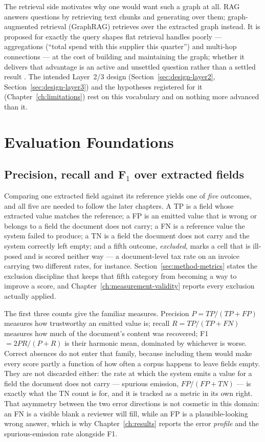 The retrieval side motivates why one would want such a graph at all.
\ac{RAG} answers questions by retrieving text chunks and generating over them;
graph-augmented retrieval (GraphRAG) retrieves over the extracted graph instead. It is
proposed for exactly the query shapes flat retrieval handles poorly --- aggregations
(``total spend with this supplier this quarter'') and multi-hop connections --- at the cost
of building and maintaining the graph; whether it delivers that advantage is an active and
unsettled question rather than a settled result \parencite{edge2024graphrag,han2025}.
The intended Layer~2/3 design (Section~\ref{sec:design-layer2},
Section~\ref{sec:design-layer3}) and the hypotheses registered for it
(Chapter~\ref{ch:limitations}) rest on this vocabulary and on nothing more
advanced than it.

\section{Evaluation Foundations}
\label{sec:bg-eval}

\subsection{Precision, recall and F$_1$ over extracted fields}

Comparing one extracted field against its reference yields one of \emph{five} outcomes,
and all five are needed to follow the later chapters. A \ac{TP} is a field whose extracted
value matches the reference; a \ac{FP} is an emitted value that is wrong or belongs to a
field the document does not carry; a \ac{FN} is a reference value the system failed to
produce; a \ac{TN} is a field the document does not carry and the system correctly left
empty; and a fifth outcome, \emph{excluded}, marks a cell that is ill-posed and is scored
neither way --- a document-level tax rate on an invoice carrying two different rates, for
instance. Section~\ref{sec:method-metrics} states the exclusion discipline that keeps that fifth
category from becoming a way to improve a score, and
Chapter~\ref{ch:measurement-validity} reports every exclusion actually applied.

The first three counts give the familiar measures. Precision
$P = \mathit{TP}/(\mathit{TP}+\mathit{FP})$ measures how trustworthy
an emitted value is; recall $R = \mathit{TP}/(\mathit{TP}+\mathit{FN})$ measures how
much of the document's content was recovered; \ac{F1} $= 2PR/(P+R)$ is their harmonic
mean, dominated by whichever is worse. Correct absences do not enter that family, because
including them would make every score partly a function of how often a corpus happens to
leave fields empty. They are not discarded either: the rate at which the system emits a
value for a field the document does not carry --- spurious emission, $\mathit{FP}/(\mathit{FP}+\mathit{TN})$ ---
is exactly what the \ac{TN} count is for, and it is tracked as a metric in its own right.
That asymmetry between the two error directions is
not cosmetic in this domain: an \ac{FN} is a visible blank a reviewer will fill, while
an \ac{FP} is a plausible-looking wrong answer, which is why
Chapter~\ref{ch:results} reports the error \emph{profile} and the spurious-emission rate
alongside \ac{F1}.

